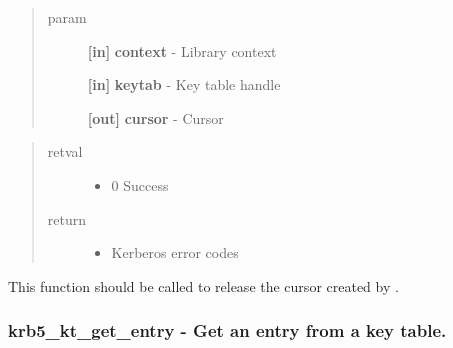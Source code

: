 \documentclass[letterpaper,10pt,english]{sphinxmanual}
\begin{document}
\begin{fulllineitems}
\label{appdev/refs/api/krb5_kt_end_seq_get:krb5_kt_end_seq_get}
\end{fulllineitems}

\begin{quote}\begin{description}
\item[{param}] \leavevmode
\textbf{{[}in{]}} \textbf{context} - Library context

\textbf{{[}in{]}} \textbf{keytab} - Key table handle

\textbf{{[}out{]}} \textbf{cursor} - Cursor

\end{description}\end{quote}
\begin{quote}\begin{description}
\item[{retval}] \leavevmode\begin{itemize}
\item {} 
0   Success

\end{itemize}

\item[{return}] \leavevmode\begin{itemize}
\item {} 
Kerberos error codes

\end{itemize}

\end{description}\end{quote}

This function should be called to release the cursor created by {\hyperref[appdev/refs/api/krb5_kt_start_seq_get:krb5_kt_start_seq_get]{}} .


\subsubsection{krb5\_kt\_get\_entry -  Get an entry from a key table.}
\label{appdev/refs/api/krb5_kt_get_entry:krb5-kt-get-entry-get-an-entry-from-a-key-table}\label{appdev/refs/api/krb5_kt_get_entry::doc}
\end{document}
